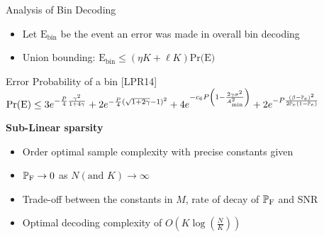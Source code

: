 \begin{frame}{Analysis of Bin Decoding}
\begin{itemize}
\item Let $\text{E}_{\text{bin}}$ be the event an error was made in overall bin decoding
\item Union bounding: $\text{E}_{\text{bin}}\leq (\eta K+\ell K)\text{Pr(E)}$
\end{itemize}
\begin{block}{Error Probability of a bin [LPR14]}
$\text{Pr(E)}\leq 3e^{-\frac{P}{4}\frac{\gamma^2}{1+4 \gamma}}+2e^{-\frac{P}{4}(\sqrt{1+2\gamma}-1)^2}+4e^{-c_6 P\left(1-\frac{2\gamma\sigma^2}{A^{2}_{\text{min}}}\right)}+2e^{-P\frac{\left(\beta-\mathbb{P}_{e}\right)^2}{2\mathbb{P}_{e}(1-\mathbb{P}_{e})}}$
\end{block}
\vspace{2ex}
\begin{description}
    \item[\textbf{Sub-Linear sparsity}]
\end{description}
\begin{itemize}
\item Order optimal sample complexity with precise constants given
\item $\mathbb{P}_{\text{F}}\rightarrow 0$ as $N (\text{and } K)\rightarrow \infty$
\item Trade-off between the constants in $M$, rate of decay of  $\mathbb{P}_{\text{F}}$ and SNR
\item Optimal decoding complexity of $O\left(K\log\left(\frac{N}{K}\right)\right)$
\end{itemize}
\end{frame}

